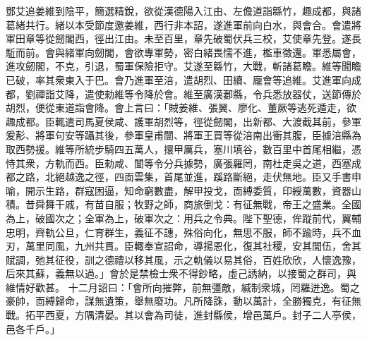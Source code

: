 \begin{pinyinscope}
 
鄧艾追姜維到陰平，簡選精銳，欲從漢德陽入江由、左儋道詣緜竹，趣成都，與諸葛緒共行。緒以本受節度邀姜維，西行非本詔，遂進軍前向白水，與會合。會遣將軍田章等從劒閣西，徑出江由。未至百里，章先破蜀伏兵三校，艾使章先登。遂長駈而前。會與緒軍向劒閣，會欲專軍勢，密白緒畏懦不進，檻車徵還。軍悉屬會，
 進攻劒閣，不克，引退，蜀軍保險拒守。艾遂至緜竹，大戰，斬諸葛瞻。維等聞瞻已破，率其衆東入于巴。會乃進軍至涪，遣胡烈、田續、龐會等追維。艾進軍向成都，劉禪詣艾降，遣使勑維等令降於會。維至廣漢郪縣，令兵悉放器仗，送節傳於胡烈，便從東道詣會降。會上言曰：「賊姜維、張翼、廖化、董厥等逃死遁走，欲趣成都。臣輒遣司馬夏侯咸、護軍胡烈等，徑從劒閣，出新都、大渡截其前，參軍爰𩇕、將軍句安等躡其後，參軍皇甫闓、將軍王買等從涪南出衝其腹，臣據涪縣為取西勢援。維等所統步騎四五萬人，擐甲厲兵，塞川填谷，數百里中首尾相繼，憑恃其衆，方軌而西。臣勑咸、闓等令分兵據勢，廣張羅罔，南杜走吳之道，西塞成都之路，北絕越逸之徑，四靣雲集，首尾並進，蹊路斷絕，走伏無地。臣又手書申喻，開示生路，群寇困逼，知命窮數盡，解甲投戈，靣縛委質，印綬萬數，資器山積。昔舜舞干戚，有苗自服；牧野之師，商旅倒戈：有征無戰，帝王之盛業。全國為上，破國次之；全軍為上，破軍次之：用兵之令典。陛下聖德，侔蹤前代，翼輔忠明，齊軌公旦，仁育群生，義征不譓，殊俗向化，無思不服，師不踰時，兵不血刃，萬里同風，九州共貫。臣輙奉宣詔命，導揚恩化，復其社稷，安其閭伍，舍其賦調，弛其征役，訓之德禮以移其風，示之軌儀以易其俗，百姓欣欣，人懷逸豫，后來其蘇，義無以過。」會於是禁檢士衆不得鈔略，虛己誘納，以接蜀之群司，與維情好歡甚。
 十二月詔曰：「會所向摧弊，前無彊敵，緘制衆城，罔羅迸逸。蜀之豪帥，靣縛歸命，謀無遺策，舉無廢功。凡所降誅，動以萬計，全勝獨克，有征無戰。拓平西夏，方隅清晏。其以會為司徒，進封縣侯，增邑萬戶。封子二人亭侯，邑各千戶。」
 

\end{pinyinscope}
